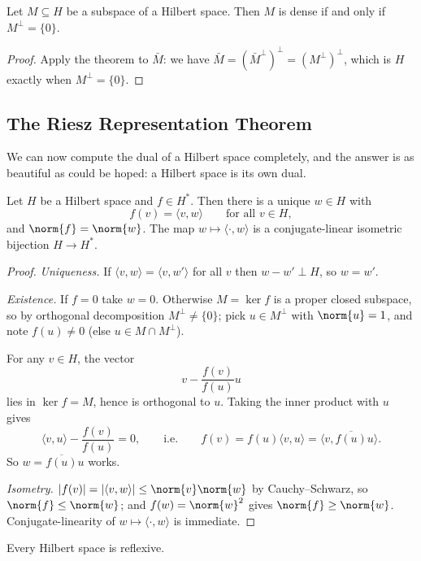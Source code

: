 \documentclass[a4paper]{scrartcl}
\newcommand{\ip}[2]{\langle #1, #2 \rangle}
\begin{document}
\begin{corollary}
	Let $M \subseteq H$ be a subspace of a Hilbert space. Then $M$ is dense if and only if $M^\perp = \{0\}$.
\end{corollary}

\begin{proof}
	Apply the theorem to $\bar M$: we have $\bar M = (\bar M^\perp)^\perp = (M^\perp)^\perp$, which is $H$ exactly when $M^\perp = \{0\}$.
\end{proof}

\subsection{The Riesz Representation Theorem}

We can now compute the dual of a Hilbert space completely, and the answer is as beautiful as could be hoped: a Hilbert space is its own dual.

\begin{theorem}
	Let $H$ be a Hilbert space and $f \in H^*$. Then there is a unique $w \in H$ with
	$$f(v) = \ip{v}{w} \qquad \text{for all } v \in H,$$
	and $\norm{f} = \norm{w}$. The map $w \mapsto \ip{\cdot}{w}$ is a conjugate-linear isometric bijection $H \to H^*$.
\end{theorem}

\begin{proof}
	\emph{Uniqueness.} If $\ip{v}{w} = \ip{v}{w'}$ for all $v$ then $w - w' \perp H$, so $w = w'$.

	\emph{Existence.} If $f = 0$ take $w = 0$. Otherwise $M = \ker f$ is a proper closed subspace, so by orthogonal decomposition $M^\perp \neq \{0\}$; pick $u \in M^\perp$ with $\norm{u}=1$, and note $f(u)\neq 0$ (else $u \in M \cap M^\perp$).

	For any $v \in H$, the vector
	$$v - \frac{f(v)}{f(u)}u$$
	lies in $\ker f = M$, hence is orthogonal to $u$. Taking the inner product with $u$ gives
	$$\ip{v}{u} - \frac{f(v)}{f(u)} = 0, \qquad \text{i.e.}\qquad f(v) = f(u)\ip{v}{u} = \ip{v}{\overline{f(u)}u}.$$
	So $w = \overline{f(u)}u$ works.

	\emph{Isometry.} $|f(v)| = |\ip{v}{w}| \leq \norm{v}\norm{w}$ by Cauchy--Schwarz, so $\norm{f}\leq\norm{w}$; and $f(w) = \norm{w}^2$ gives $\norm{f}\geq\norm{w}$. Conjugate-linearity of $w \mapsto \ip{\cdot}{w}$ is immediate.
\end{proof}

\begin{corollary}
	Every Hilbert space is reflexive.
\end{corollary}
\end{document}
